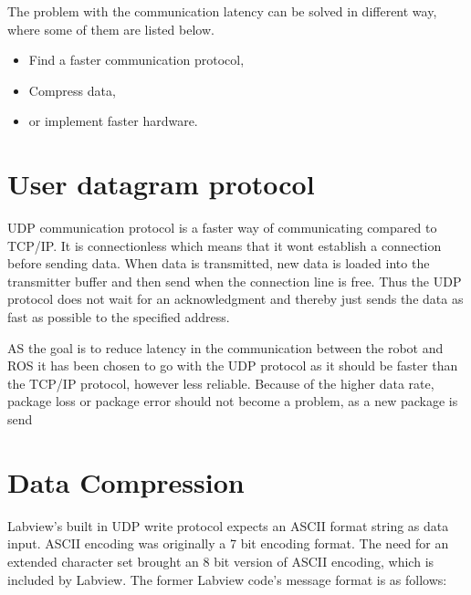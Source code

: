 The problem with the communication latency can be solved in different way, where some of them are listed below.

\begin{itemize}
	\item Find a faster communication protocol,
	\item Compress data,
	\item or implement faster hardware.	
\end{itemize}

\section*{User datagram protocol}
UDP communication protocol is a faster way of communicating compared to TCP/IP. It is connectionless which means that it wont establish a connection before sending data. When data is transmitted, new data is loaded into the transmitter buffer and then send when the connection line is free. Thus the UDP protocol does not wait for an acknowledgment and thereby just sends the data as fast as possible to the specified address.

AS the goal is to reduce latency in the communication between the robot and ROS it has been chosen to go with the UDP protocol as it should be faster than the TCP/IP protocol, however less reliable. Because of the higher data rate, package loss or package error should not become a problem, as a new package is send 



\section{Data Compression}

Labview's built in UDP write protocol expects an ASCII format string as data input. ASCII encoding was originally a 7 bit encoding format. The need for an extended character set brought an 8 bit version of ASCII encoding, which is included by Labview. The former Labview code's message format is as follows:

